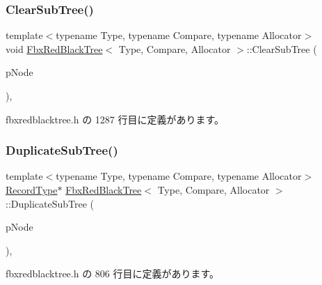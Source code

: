 \subsubsection{\texorpdfstring{Clear\+Sub\+Tree()}{ClearSubTree()}}
{\footnotesize\ttfamily template$<$typename Type, typename Compare, typename Allocator$>$ \\
void \hyperlink{class_fbx_red_black_tree}{Fbx\+Red\+Black\+Tree}$<$ Type, Compare, Allocator $>$\+::Clear\+Sub\+Tree (\begin{DoxyParamCaption}\item[{\hyperlink{class_fbx_red_black_tree_1_1_record_type}{Record\+Type} $\ast$}]{p\+Node }\end{DoxyParamCaption})\hspace{0.3cm}{\ttfamily [inline]}, {\ttfamily [protected]}}



 fbxredblacktree.\+h の 1287 行目に定義があります。

\mbox{\label{class_fbx_red_black_tree_a11fd717eeb71ff16ef10114a00cc7888}} 
\subsubsection{\texorpdfstring{Duplicate\+Sub\+Tree()}{DuplicateSubTree()}}
{\footnotesize\ttfamily template$<$typename Type, typename Compare, typename Allocator$>$ \\
\hyperlink{class_fbx_red_black_tree_1_1_record_type}{Record\+Type}$\ast$ \hyperlink{class_fbx_red_black_tree}{Fbx\+Red\+Black\+Tree}$<$ Type, Compare, Allocator $>$\+::Duplicate\+Sub\+Tree (\begin{DoxyParamCaption}\item[{const \hyperlink{class_fbx_red_black_tree_1_1_record_type}{Record\+Type} $\ast$}]{p\+Node }\end{DoxyParamCaption})\hspace{0.3cm}{\ttfamily [inline]}, {\ttfamily [protected]}}



 fbxredblacktree.\+h の 806 行目に定義があります。

\mbox{\label{class_fbx_red_black_tree_ab885c9a32cffb04da71d5dccb70bc945}} 
